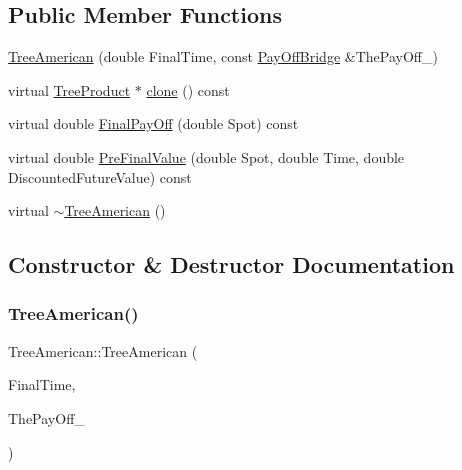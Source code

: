 \subsection*{Public Member Functions}
\begin{DoxyCompactItemize}
\item 
\hyperlink{classTreeAmerican_abad26455948d0de73ecf79f7366825d9}{Tree\+American} (double Final\+Time, const \hyperlink{classPayOffBridge}{Pay\+Off\+Bridge} \&The\+Pay\+Off\+\_\+)
\item 
virtual \hyperlink{classTreeProduct}{Tree\+Product} $\ast$ \hyperlink{classTreeAmerican_ade2d404dec9ebd28695f246393dd0256}{clone} () const
\item 
virtual double \hyperlink{classTreeAmerican_ad3a967025c3355fdce85f5d28afcc302}{Final\+Pay\+Off} (double Spot) const
\item 
virtual double \hyperlink{classTreeAmerican_aac1d79d79a45a83a06cdbaaf9d80018e}{Pre\+Final\+Value} (double Spot, double Time, double Discounted\+Future\+Value) const
\item 
virtual \hyperlink{classTreeAmerican_a9f6c80b655c9792d9a9698e3d19157f5}{$\sim$\+Tree\+American} ()
\end{DoxyCompactItemize}


\subsection{Constructor \& Destructor Documentation}
\hypertarget{classTreeAmerican_abad26455948d0de73ecf79f7366825d9}{}\label{classTreeAmerican_abad26455948d0de73ecf79f7366825d9} 
\subsubsection{\texorpdfstring{Tree\+American()}{TreeAmerican()}}
{\footnotesize\ttfamily Tree\+American\+::\+Tree\+American (\begin{DoxyParamCaption}\item[{double}]{Final\+Time,  }\item[{const \hyperlink{classPayOffBridge}{Pay\+Off\+Bridge} \&}]{The\+Pay\+Off\+\_\+ }\end{DoxyParamCaption})}

\hypertarget{classTreeAmerican_a9f6c80b655c9792d9a9698e3d19157f5}{}\label{classTreeAmerican_a9f6c80b655c9792d9a9698e3d19157f5} 

